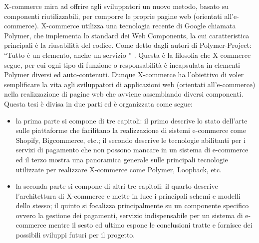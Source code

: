 \newline
X-commerce mira ad offrire agli sviluppatori un nuovo metodo, basato su componenti riutilizzabili, per comporre le proprie pagine web (orientati all’e-commerce).
\newline
X-commerce utilizza una tecnologia recente di Google chiamata Polymer, che implementa lo standard dei Web Components, la cui caratteristica principali è la riusabilità del codice.
\newline
Come detto dagli autori di Polymer-Project: “Tutto è un elemento, anche un servizio ” \cite{polymer_world_view}. Questa è la filosofia che X-commerce segue, per cui ogni tipo di funzione o responsabilità è incapsulata in elementi Polymer diversi ed auto-contenuti. Dunque X-commerce ha l’obiettivo di voler semplificare la vita agli sviluppatori di applicazioni web (orientati all’e-commerce) nella realizzazione di pagine web che avviene assemblando diversi componenti.
\newline
Questa tesi è divisa in due parti ed è organizzata come segue:
\begin{itemize}
\item
la prima parte si compone di tre capitoli: il primo descrive lo stato dell’arte sulle piattaforme che facilitano la realizzazione di sistemi e-commerce come Shopify, Bigcommerce, etc.; il secondo descrive le tecnologie abilitanti per i servizi di pagamento che non possono mancare in un sistema di e-commerce ed il terzo mostra una panoramica generale sulle principali tecnologie utilizzate per realizzare X-commerce come Polymer, Loopback, etc.
\item la seconda parte si compone di altri tre capitoli: il quarto descrive l'architettura di X-commerce e mette in luce i principali schemi e modelli dello stesso; il quinto si focalizza principalmente su un componente specifico ovvero la gestione dei pagamenti, servizio indispensabile per un sistema di e-commerce mentre il sesto ed ultimo espone le conclusioni tratte e fornisce dei possibili sviluppi futuri per il progetto.
\end{itemize}